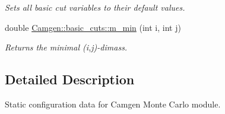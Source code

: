 \begin{DoxyCompactItemize}
\begin{DoxyCompactList}\small\item\em Sets all basic cut variables to their default values. \end{DoxyCompactList}\item 
\hypertarget{a00850_ad9a932146d48ae43b7f29776cd917921}{double \hyperlink{a00850_ad9a932146d48ae43b7f29776cd917921}{Camgen\-::basic\-\_\-cuts\-::m\-\_\-min} (int i, int j)}\label{a00850_ad9a932146d48ae43b7f29776cd917921}

\begin{DoxyCompactList}\small\item\em Returns the minimal (i,j)-\/dimass. \end{DoxyCompactList}\end{DoxyCompactItemize}


\subsection{Detailed Description}
Static configuration data for Camgen Monte Carlo module. 